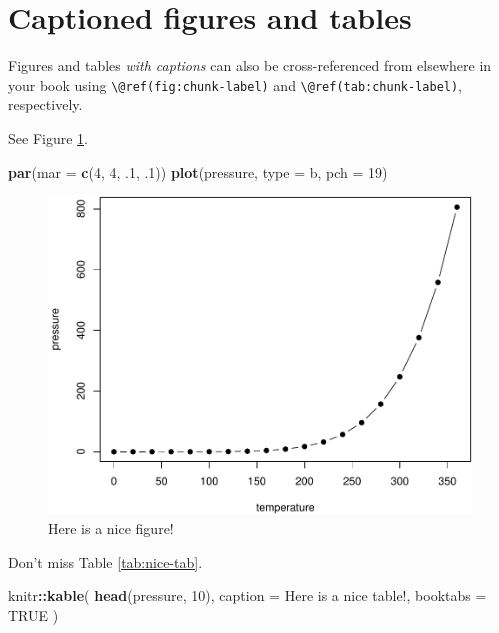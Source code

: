 \documentclass[
]{book}
\newenvironment{Shaded}{\begin{snugshade}}{\end{snugshade}}
\newcommand{\AttributeTok}[1]{\textcolor[rgb]{0.13,0.29,0.53}{#1}}
\newcommand{\ConstantTok}[1]{\textcolor[rgb]{0.56,0.35,0.01}{#1}}
\newcommand{\DecValTok}[1]{\textcolor[rgb]{0.00,0.00,0.81}{#1}}
\newcommand{\FunctionTok}[1]{\textcolor[rgb]{0.13,0.29,0.53}{\textbf{#1}}}
\newcommand{\NormalTok}[1]{#1}
\newcommand{\SpecialCharTok}[1]{\textcolor[rgb]{0.81,0.36,0.00}{\textbf{#1}}}
\newcommand{\StringTok}[1]{\textcolor[rgb]{0.31,0.60,0.02}{#1}}
\theoremstyle{definition}
\theoremstyle{definition}
\theoremstyle{definition}
\theoremstyle{definition}
\theoremstyle{remark}
\begin{document}
\hypertarget{captioned-figures-and-tables}{%
\section{Captioned figures and tables}\label{captioned-figures-and-tables}}

Figures and tables \emph{with captions} can also be cross-referenced from elsewhere in your book using \texttt{\textbackslash{}@ref(fig:chunk-label)} and \texttt{\textbackslash{}@ref(tab:chunk-label)}, respectively.

See Figure \ref{fig:nice-fig}.

\begin{Shaded}
\begin{Highlighting}[]
\FunctionTok{par}\NormalTok{(}\AttributeTok{mar =} \FunctionTok{c}\NormalTok{(}\DecValTok{4}\NormalTok{, }\DecValTok{4}\NormalTok{, .}\DecValTok{1}\NormalTok{, .}\DecValTok{1}\NormalTok{))}
\FunctionTok{plot}\NormalTok{(pressure, }\AttributeTok{type =} \StringTok{\textquotesingle{}b\textquotesingle{}}\NormalTok{, }\AttributeTok{pch =} \DecValTok{19}\NormalTok{)}
\end{Highlighting}
\end{Shaded}

\begin{figure}

{\centering \includegraphics[width=0.8\linewidth]{_main_files/figure-latex/nice-fig-1} 

}

\caption{Here is a nice figure!}\label{fig:nice-fig}
\end{figure}

Don't miss Table \ref{tab:nice-tab}.

\begin{Shaded}
\begin{Highlighting}[]
\NormalTok{knitr}\SpecialCharTok{::}\FunctionTok{kable}\NormalTok{(}
  \FunctionTok{head}\NormalTok{(pressure, }\DecValTok{10}\NormalTok{), }\AttributeTok{caption =} \StringTok{\textquotesingle{}Here is a nice table!\textquotesingle{}}\NormalTok{,}
  \AttributeTok{booktabs =} \ConstantTok{TRUE}
\NormalTok{)}
\end{Highlighting}
\end{Shaded}
\end{document}
